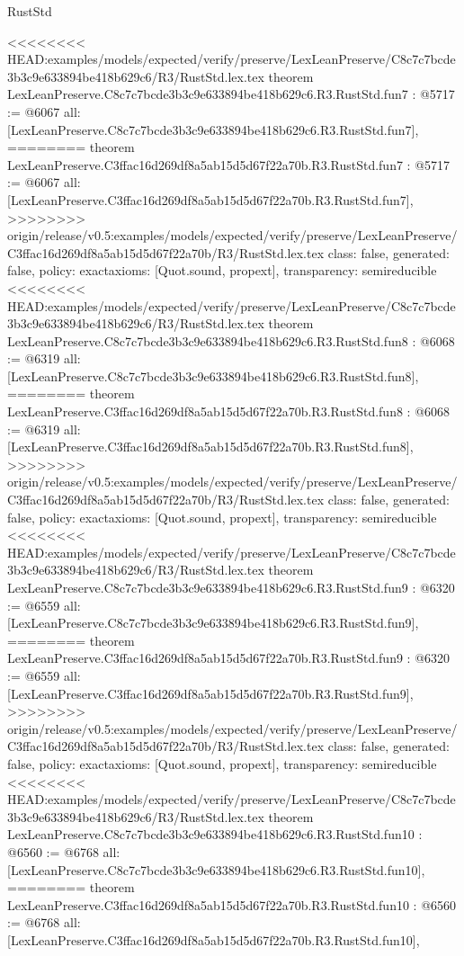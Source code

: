\begin{lexlean}{RustStd}
\begin{coremodule}
{\begin{coremodule}
{{{{{{{{{{}
<<<<<<<< HEAD:examples/models/expected/verify/preserve/LexLeanPreserve/C8c7c7bcde3b3c9e633894be418b629c6/R3/RustStd.lex.tex
theorem LexLeanPreserve.C8c7c7bcde3b3c9e633894be418b629c6.R3.RustStd.fun7 : @5717 := @6067 {
  all: [LexLeanPreserve.C8c7c7bcde3b3c9e633894be418b629c6.R3.RustStd.fun7],
========
theorem LexLeanPreserve.C3ffac16d269df8a5ab15d5d67f22a70b.R3.RustStd.fun7 : @5717 := @6067 {
  all: [LexLeanPreserve.C3ffac16d269df8a5ab15d5d67f22a70b.R3.RustStd.fun7],
>>>>>>>> origin/release/v0.5:examples/models/expected/verify/preserve/LexLeanPreserve/C3ffac16d269df8a5ab15d5d67f22a70b/R3/RustStd.lex.tex
  class: false,
  generated: false,
  policy: exact{axioms: [Quot.sound, propext]},
  transparency: semireducible
}
<<<<<<<< HEAD:examples/models/expected/verify/preserve/LexLeanPreserve/C8c7c7bcde3b3c9e633894be418b629c6/R3/RustStd.lex.tex
theorem LexLeanPreserve.C8c7c7bcde3b3c9e633894be418b629c6.R3.RustStd.fun8 : @6068 := @6319 {
  all: [LexLeanPreserve.C8c7c7bcde3b3c9e633894be418b629c6.R3.RustStd.fun8],
========
theorem LexLeanPreserve.C3ffac16d269df8a5ab15d5d67f22a70b.R3.RustStd.fun8 : @6068 := @6319 {
  all: [LexLeanPreserve.C3ffac16d269df8a5ab15d5d67f22a70b.R3.RustStd.fun8],
>>>>>>>> origin/release/v0.5:examples/models/expected/verify/preserve/LexLeanPreserve/C3ffac16d269df8a5ab15d5d67f22a70b/R3/RustStd.lex.tex
  class: false,
  generated: false,
  policy: exact{axioms: [Quot.sound, propext]},
  transparency: semireducible
}
<<<<<<<< HEAD:examples/models/expected/verify/preserve/LexLeanPreserve/C8c7c7bcde3b3c9e633894be418b629c6/R3/RustStd.lex.tex
theorem LexLeanPreserve.C8c7c7bcde3b3c9e633894be418b629c6.R3.RustStd.fun9 : @6320 := @6559 {
  all: [LexLeanPreserve.C8c7c7bcde3b3c9e633894be418b629c6.R3.RustStd.fun9],
========
theorem LexLeanPreserve.C3ffac16d269df8a5ab15d5d67f22a70b.R3.RustStd.fun9 : @6320 := @6559 {
  all: [LexLeanPreserve.C3ffac16d269df8a5ab15d5d67f22a70b.R3.RustStd.fun9],
>>>>>>>> origin/release/v0.5:examples/models/expected/verify/preserve/LexLeanPreserve/C3ffac16d269df8a5ab15d5d67f22a70b/R3/RustStd.lex.tex
  class: false,
  generated: false,
  policy: exact{axioms: [Quot.sound, propext]},
  transparency: semireducible
}
<<<<<<<< HEAD:examples/models/expected/verify/preserve/LexLeanPreserve/C8c7c7bcde3b3c9e633894be418b629c6/R3/RustStd.lex.tex
theorem LexLeanPreserve.C8c7c7bcde3b3c9e633894be418b629c6.R3.RustStd.fun10 : @6560 := @6768 {
  all: [LexLeanPreserve.C8c7c7bcde3b3c9e633894be418b629c6.R3.RustStd.fun10],
========
theorem LexLeanPreserve.C3ffac16d269df8a5ab15d5d67f22a70b.R3.RustStd.fun10 : @6560 := @6768 {
  all: [LexLeanPreserve.C3ffac16d269df8a5ab15d5d67f22a70b.R3.RustStd.fun10],
}}}}}}}}}}}}}}
\end{coremodule}}
\end{coremodule}
\end{lexlean}

